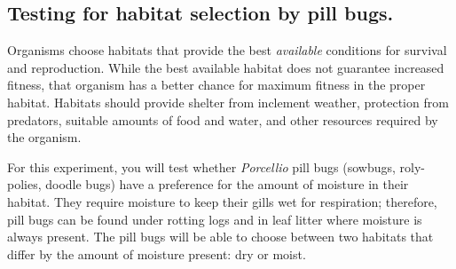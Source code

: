 \documentclass[12pt, hidelinks]{exam}
\begin{document}
\subsection*{Testing for habitat selection by pill bugs.}

Organisms choose habitats that provide the best \emph{available} conditions for survival and reproduction.  While the best available habitat does not guarantee increased fitness, that organism has a better chance for maximum fitness in the proper habitat.  Habitats should provide shelter from inclement weather, protection from predators, suitable amounts of food and water, and other resources required by the organism. 

For this experiment, you will test whether \textit{Porcellio} pill bugs (sowbugs, roly-polies, doodle bugs) have a preference for the amount of moisture in their habitat. They require moisture to keep their gills wet for respiration; therefore, pill bugs can be found under rotting logs and in leaf litter where moisture is always present. The pill bugs will be able to choose between two habitats that differ by the amount of moisture present: dry or moist.%
\end{document}
